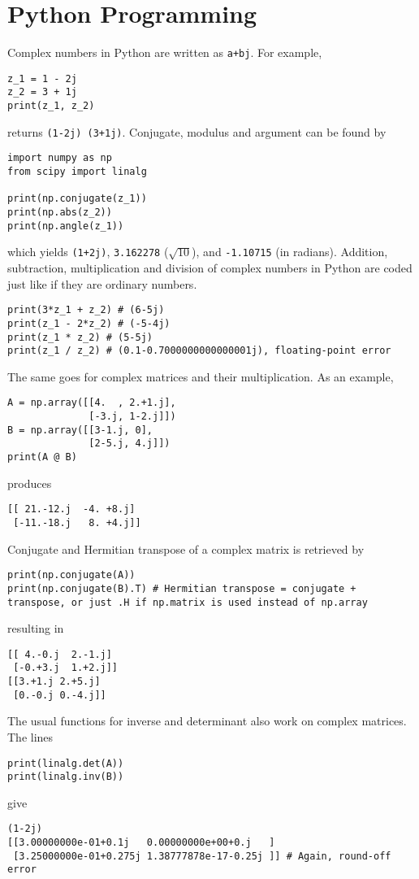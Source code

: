 \section{Python Programming}
Complex numbers in Python are written as \verb|a+bj|. For example,
\begin{lstlisting}
z_1 = 1 - 2j
z_2 = 3 + 1j
print(z_1, z_2)
\end{lstlisting}
returns \verb|(1-2j) (3+1j)|. Conjugate, modulus and argument can be found by
\begin{lstlisting}
import numpy as np
from scipy import linalg

print(np.conjugate(z_1))
print(np.abs(z_2))    
print(np.angle(z_1))
\end{lstlisting}
which yields \verb|(1+2j)|, \verb|3.162278| ($\sqrt{10}$), and \verb|-1.10715| (in radians). Addition, subtraction, multiplication and division of complex numbers in Python are coded just like if they are ordinary numbers.
\begin{lstlisting}
print(3*z_1 + z_2) # (6-5j)
print(z_1 - 2*z_2) # (-5-4j)
print(z_1 * z_2) # (5-5j)
print(z_1 / z_2) # (0.1-0.7000000000000001j), floating-point error
\end{lstlisting}
The same goes for complex matrices and their multiplication. As an example,
\begin{lstlisting}
A = np.array([[4.  , 2.+1.j],
              [-3.j, 1-2.j]])
B = np.array([[3-1.j, 0],
              [2-5.j, 4.j]])
print(A @ B)
\end{lstlisting}
produces
\begin{lstlisting}
[[ 21.-12.j  -4. +8.j]
 [-11.-18.j   8. +4.j]]    
\end{lstlisting}
Conjugate and Hermitian transpose of a complex matrix is retrieved by
\begin{lstlisting}
print(np.conjugate(A))
print(np.conjugate(B).T) # Hermitian transpose = conjugate + transpose, or just .H if np.matrix is used instead of np.array
\end{lstlisting}
resulting in
\begin{lstlisting}
[[ 4.-0.j  2.-1.j]
 [-0.+3.j  1.+2.j]]
[[3.+1.j 2.+5.j]
 [0.-0.j 0.-4.j]]
\end{lstlisting}
The usual functions for inverse and determinant also work on complex matrices. The lines
\begin{lstlisting}
print(linalg.det(A))
print(linalg.inv(B))
\end{lstlisting}
give
\begin{lstlisting}
(1-2j)
[[3.00000000e-01+0.1j   0.00000000e+00+0.j   ]
 [3.25000000e-01+0.275j 1.38777878e-17-0.25j ]] # Again, round-off error    
\end{lstlisting}
